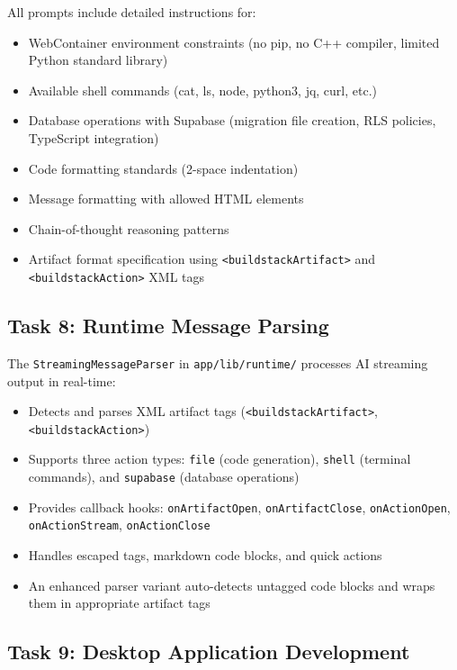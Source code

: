 \documentclass[12pt,a4paper,openany]{report}
\begin{document}
All prompts include detailed instructions for:
\begin{itemize}
    \item WebContainer environment constraints (no pip, no C++ compiler, limited Python standard library)
    \item Available shell commands (cat, ls, node, python3, jq, curl, etc.)
    \item Database operations with Supabase (migration file creation, RLS policies, TypeScript integration)
    \item Code formatting standards (2-space indentation)
    \item Message formatting with allowed HTML elements
    \item Chain-of-thought reasoning patterns
    \item Artifact format specification using \texttt{\textless buildstackArtifact\textgreater} and \texttt{\textless buildstackAction\textgreater} XML tags
\end{itemize}

\subsection{Task 8: Runtime Message Parsing}

The \texttt{StreamingMessageParser} in \texttt{app/lib/runtime/} processes AI streaming output in real-time:
\begin{itemize}
    \item Detects and parses XML artifact tags (\texttt{\textless buildstackArtifact\textgreater}, \texttt{\textless buildstackAction\textgreater})
    \item Supports three action types: \texttt{file} (code generation), \texttt{shell} (terminal commands), and \texttt{supabase} (database operations)
    \item Provides callback hooks: \texttt{onArtifactOpen}, \texttt{onArtifactClose}, \texttt{onActionOpen}, \texttt{onActionStream}, \texttt{onActionClose}
    \item Handles escaped tags, markdown code blocks, and quick actions
    \item An enhanced parser variant auto-detects untagged code blocks and wraps them in appropriate artifact tags
\end{itemize}

\subsection{Task 9: Desktop Application Development}
\end{document}
